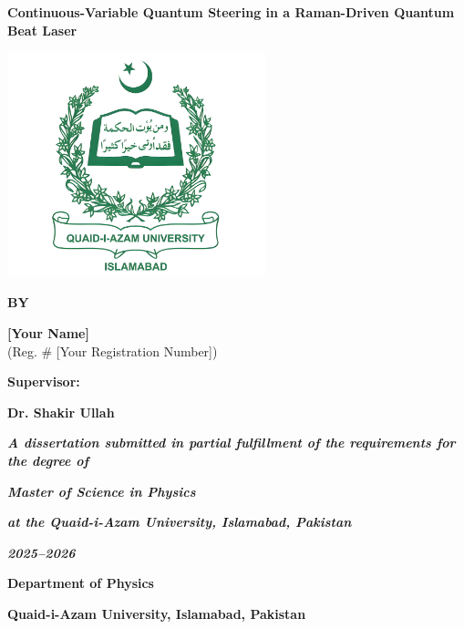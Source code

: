 \documentclass[12pt,a4paper]{report}
\begin{document}
\newpage
\begin{titlepage}
	\centering

	{\LARGE \textbf{Continuous-Variable Quantum Steering in a Raman-Driven Quantum Beat Laser} \par}
	\vspace{0.8cm}

	\includegraphics[width=7.5cm]{QAU_enhanced_Logo}
	\vspace{0.5cm}

	{\large \textbf{BY} \par}
	{\Large \textbf{[Your Name]} \\}
	{\centering\large (Reg. \# [Your Registration Number])}
	\vspace{0.5cm}

	{\large \textbf{Supervisor:} \\}
	{\Large \textbf{Dr. Shakir Ullah} \par}

	\vspace{0.8cm}
	\begin{spacing}{1.2}
		{\textbf{\textit{A dissertation submitted in partial fulfillment of the requirements for the degree of}}}
		{\Large \textit{\textbf{Master of Science in Physics}} \par}
		{\textbf{\textit{at the Quaid-i-Azam University, Islamabad, Pakistan}} \par}
		{\textbf{\textit{2025--2026}} \par}
	\end{spacing}
		\vspace{1cm}
	{\Large\textbf{Department of Physics} \\}
	{\textbf{Quaid-i-Azam University, Islamabad, Pakistan} \par}

\end{titlepage}
\end{document}
